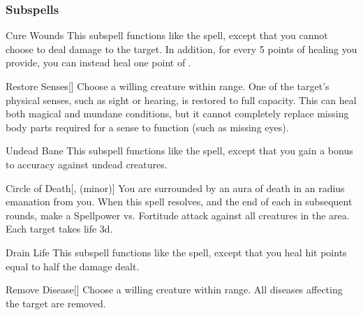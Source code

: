 \subsubsection{Subspells}


\begin{ability}[\nth{2}]{Cure Wounds}
This subspell functions like the  spell, except that you cannot choose to deal damage to the target.
In addition, for every 5 points of healing you provide, you can instead heal one point of .
\end{ability}
\vspace{0.25em}


\begin{ability}[\nth{2}]{Restore Senses}[]
Choose a willing creature within \rngclose range.
One of the target's physical senses, such as sight or hearing, is restored to full capacity.
This can heal both magical and mundane conditions, but it cannot completely replace missing body parts required for a sense to function (such as missing eyes).
\end{ability}
\vspace{0.25em}


\begin{ability}[\nth{2}]{Undead Bane}
This subspell functions like the  spell, except that you gain a  bonus to accuracy against undead creatures.
\end{ability}
\vspace{0.25em}


\begin{ability}[\nth{3}]{Circle of Death}[,  (minor)]
You are surrounded by an aura of death in an \areamed radius emanation from you.
When this spell resolves, and the end of each  in subsequent rounds, make a Spellpower vs. Fortitude attack against all creatures in the area.
\hit Each target takes life  \minus3d.
\end{ability}
\vspace{0.25em}


\begin{ability}[\nth{3}]{Drain Life}
This subspell functions like the  spell, except that you heal hit points equal to half the damage dealt.
\end{ability}
\vspace{0.25em}


\begin{ability}[\nth{3}]{Remove Disease}[]
Choose a willing creature within \rngclose range.
All diseases affecting the target are removed.
\end{ability}
\vspace{0.25em}


